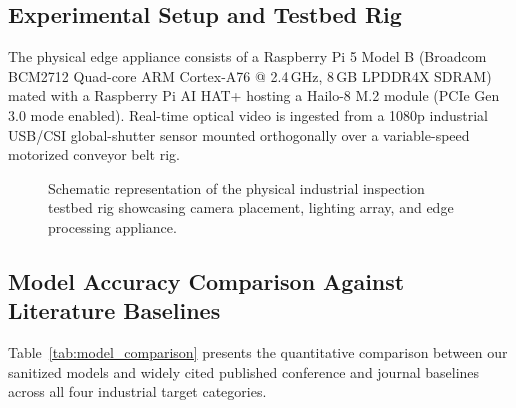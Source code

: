 \documentclass[conference]{IEEEtran}
\begin{document}
\subsection{Experimental Setup and Testbed Rig}
The physical edge appliance consists of a Raspberry Pi 5 Model B (Broadcom BCM2712 Quad-core ARM Cortex-A76 @ 2.4\,GHz, 8\,GB LPDDR4X SDRAM) mated with a Raspberry Pi AI HAT+ hosting a Hailo-8 M.2 module (PCIe Gen 3.0 mode enabled). Real-time optical video is ingested from a 1080p industrial USB/CSI global-shutter sensor mounted orthogonally over a variable-speed motorized conveyor belt rig.

\begin{figure}[h]
\centering
{}
\caption{Schematic representation of the physical industrial inspection testbed rig showcasing camera placement, lighting array, and edge processing appliance.}
\label{fig:rig_placeholder}
\end{figure}

\subsection{Model Accuracy Comparison Against Literature Baselines}
Table~\ref{tab:model_comparison} presents the quantitative comparison between our sanitized models and widely cited published conference and journal baselines across all four industrial target categories.
\end{document}
